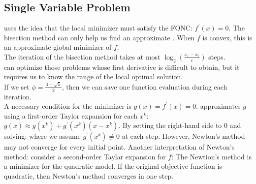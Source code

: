 \documentclass[12pt]{report}
\begin{document}

\subsection{Single Variable Problem}
 uses the idea that the local minimizer must satisfy the FONC: $f^{\prime}(x)=0.$
The bisection method can only help us find an approximate . When $f$ is convex, this is an approximate global minimizer of $f$.\\
The iteration of the bisection method takes at most $\log_2(\frac{x_r-x_\ell}\epsilon)$ steps.\\
 can optimize those problems whose first derivative is difficult to obtain, but it requires us to know the range of the local optimal solution.\\
If we set $\phi=\frac{3-\sqrt{5}}2$, then we can save one function evaluation during each iteration.\\
A necessary condition for the minimizer is $g(x)=f^\prime(x)=0$.  approximates $g$ using a first-order
Taylor expansion for each $x^k$: $g(x)\approx g(x^k)+g^{\prime}(x^k)(x-x^k).$ By setting the right-hand side to 0 and solving:
where we assume $g^\prime(x^k)\ne0$ at each step. However, Newton's method may not converge for every initial point.
Another interpretation of Newton's method: consider a second-order Taylar expansion for $f$:
The Newtion's method is a minimizer for the quadratic model. If the original objective function is quadratic, then Newton's method converges in one step.
\end{document}
